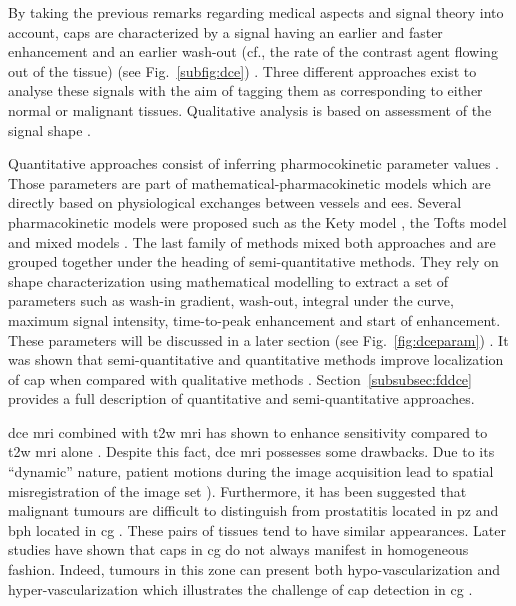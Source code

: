 By taking the previous remarks regarding medical aspects and signal theory into account, \acp{cap} are characterized by a signal having an earlier and faster enhancement and an earlier wash-out (cf., the rate of the contrast agent flowing out of the tissue) (see Fig.~\ref{subfig:dce}) \cite{Verma2012}.
Three different approaches exist to analyse these signals with the aim of tagging them as corresponding to either normal or malignant tissues.
Qualitative analysis is based on assessment of the signal shape \cite{Hoeks2011}.

Quantitative approaches consist of inferring pharmocokinetic parameter values \cite{Tofts2010}.
Those parameters are part of mathematical-pharmacokinetic models which are directly based on physiological exchanges between vessels and \ac{ees}.
Several pharmacokinetic models were proposed such as the Kety model \cite{Kety1951}, the Tofts model \cite{Tofts1997} and mixed models \cite{Larsson1996,StLawrence1998}.
The last family of methods mixed both approaches and are grouped together under the heading of semi-quantitative methods.
They rely on shape characterization using mathematical modelling to extract a set of parameters such as wash-in gradient, wash-out, integral under the curve, maximum signal intensity, time-to-peak enhancement and start of enhancement.
These parameters will be discussed in a later section (see Fig.~\ref{fig:dceparam}) \cite{Hoeks2011,Verma2012}.
It was shown that semi-quantitative and quantitative methods improve localization of \ac{cap} when compared with qualitative methods \cite{Rosenkrantz2013}.
Section~\ref{subsubsec:fddce} provides a full description of quantitative and semi-quantitative approaches.


\ac{dce} \ac{mri} combined with \ac{t2w} \ac{mri} has shown to enhance sensitivity compared to \ac{t2w} \ac{mri} alone \cite{Jager1997,Kim2005,Schlemmer2004,Zelhof2009}.
Despite this fact, \ac{dce} \ac{mri} possesses some drawbacks.
Due to its ``dynamic'' nature, patient motions during the image acquisition lead to spatial misregistration of the image set \cite{Verma2012}).
Furthermore, it has been suggested that malignant tumours are difficult to distinguish from prostatitis located in \ac{pz} and \ac{bph} located in \ac{cg} \cite{Hoeks2011,Verma2012}.
These pairs of tissues tend to have similar appearances. Later studies have shown that \acp{cap} in \ac{cg} do not always manifest in homogeneous fashion.
Indeed, tumours in this zone can present both hypo-vascularization and hyper-vascularization which illustrates the challenge of \ac{cap} detection in \ac{cg} \cite{Niekerk2013}.

